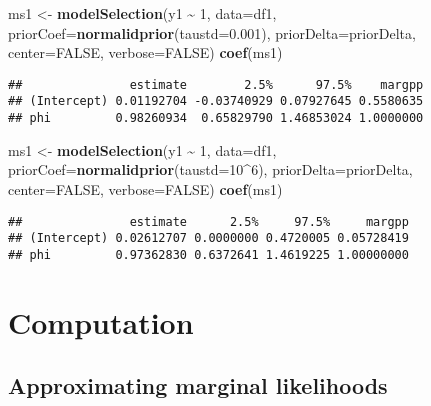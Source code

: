 \documentclass[
]{book}
\newenvironment{Shaded}{\begin{snugshade}}{\end{snugshade}}
\newcommand{\AttributeTok}[1]{\textcolor[rgb]{0.13,0.29,0.53}{#1}}
\newcommand{\ConstantTok}[1]{\textcolor[rgb]{0.56,0.35,0.01}{#1}}
\newcommand{\DecValTok}[1]{\textcolor[rgb]{0.00,0.00,0.81}{#1}}
\newcommand{\FloatTok}[1]{\textcolor[rgb]{0.00,0.00,0.81}{#1}}
\newcommand{\FunctionTok}[1]{\textcolor[rgb]{0.13,0.29,0.53}{\textbf{#1}}}
\newcommand{\NormalTok}[1]{#1}
\newcommand{\OtherTok}[1]{\textcolor[rgb]{0.56,0.35,0.01}{#1}}
\newcommand{\SpecialCharTok}[1]{\textcolor[rgb]{0.81,0.36,0.00}{\textbf{#1}}}
\theoremstyle{definition}
\theoremstyle{definition}
\theoremstyle{definition}
\theoremstyle{definition}
\theoremstyle{remark}
\begin{document}
\begin{Shaded}
\begin{Highlighting}[]
\NormalTok{ms1 }\OtherTok{\textless{}{-}} \FunctionTok{modelSelection}\NormalTok{(y1 }\SpecialCharTok{\textasciitilde{}} \DecValTok{1}\NormalTok{, }\AttributeTok{data=}\NormalTok{df1, }\AttributeTok{priorCoef=}\FunctionTok{normalidprior}\NormalTok{(}\AttributeTok{taustd=}\FloatTok{0.001}\NormalTok{), }\AttributeTok{priorDelta=}\NormalTok{priorDelta, }\AttributeTok{center=}\ConstantTok{FALSE}\NormalTok{, }\AttributeTok{verbose=}\ConstantTok{FALSE}\NormalTok{)}
\FunctionTok{coef}\NormalTok{(ms1)}
\end{Highlighting}
\end{Shaded}

\begin{verbatim}
##               estimate        2.5%      97.5%    margpp
## (Intercept) 0.01192704 -0.03740929 0.07927645 0.5580635
## phi         0.98260934  0.65829790 1.46853024 1.0000000
\end{verbatim}

\begin{Shaded}
\begin{Highlighting}[]
\NormalTok{ms1 }\OtherTok{\textless{}{-}} \FunctionTok{modelSelection}\NormalTok{(y1 }\SpecialCharTok{\textasciitilde{}} \DecValTok{1}\NormalTok{, }\AttributeTok{data=}\NormalTok{df1, }\AttributeTok{priorCoef=}\FunctionTok{normalidprior}\NormalTok{(}\AttributeTok{taustd=}\DecValTok{10}\SpecialCharTok{\^{}}\DecValTok{6}\NormalTok{), }\AttributeTok{priorDelta=}\NormalTok{priorDelta, }\AttributeTok{center=}\ConstantTok{FALSE}\NormalTok{, }\AttributeTok{verbose=}\ConstantTok{FALSE}\NormalTok{)}
\FunctionTok{coef}\NormalTok{(ms1)}
\end{Highlighting}
\end{Shaded}

\begin{verbatim}
##               estimate      2.5%     97.5%     margpp
## (Intercept) 0.02612707 0.0000000 0.4720005 0.05728419
## phi         0.97362830 0.6372641 1.4619225 1.00000000
\end{verbatim}

\section{Computation}\label{bms-computation}

\subsection{Approximating marginal likelihoods}\label{approximating-marginal-likelihoods}
\end{document}
